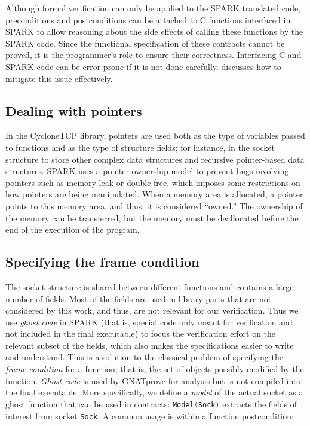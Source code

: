 \documentclass[conference]{IEEEtran}
\def\spark#1{\lstinline[language=Ada]{#1}}
\begin{document}
Although formal verification can only be applied to the SPARK translated code,  preconditions and postconditions can be attached to C functions interfaced in SPARK to allow reasoning about the side effects of calling these functions by the SPARK code. Since the functional specification of these contracts cannot be proved, it is the programmer's role to ensure their correctness. Interfacing C and SPARK code can be error-prone if it is not done carefully.  discusses how to mitigate this issue effectively.


\subsection{Dealing with pointers}
\label{sec:pointers}

In the CycloneTCP library, pointers are used both as the type of variables passed to functions and as the type of structure fields; for instance, in the socket structure to store other complex data structures and recursive pointer-based data structures. SPARK uses a pointer ownership model to prevent bugs involving pointers such as memory leak or double free, which imposes some restrictions on how pointers are being manipulated. When a memory area is allocated, a pointer points to this memory area, and thus, it is considered ``owned.'' The ownership of the memory can be transferred, but the memory must be deallocated before the end of the execution of the program.

\subsection{Specifying the frame condition}

The socket structure is shared between different functions and contains a large number of fields. Most of the fields are used in library parts that are not considered by this work, and thus, are not relevant for our verification. Thus we use \emph{ghost code} in SPARK (that is, special code only meant for verification and not included in the final executable) to focus the verification effort on the relevant subset of the fields, which also makes the specifications easier to write and understand. This is a solution to the classical problem of specifying the \emph{frame condition} for a function, that is, the set of objects possibly modified by the function. \emph{Ghost code} is used by GNATprove for analysis but is not compiled into the final executable. More specifically, we define a \emph{model} of the actual socket as a ghost function that can be used in contracts: \spark{Model(Sock)} extracts the fields of interest from socket \spark{Sock}. A common usage is within a function postcondition:
\end{document}
